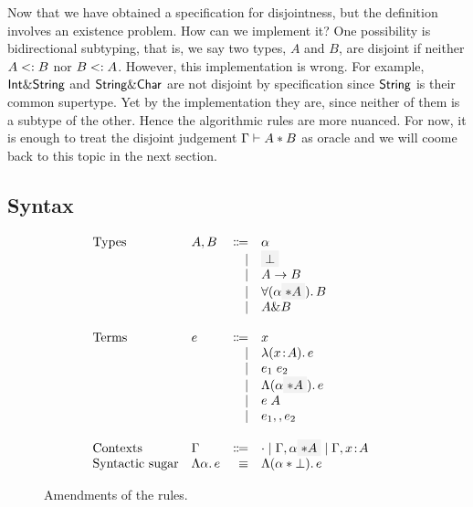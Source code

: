 Now that we have obtained a specification for disjointness, but the definition
involves an existence problem. How can we implement it? One possibility is
bidirectional subtyping, that is, we say two types, $A$ and $B$, are disjoint if
neither $A <: B$ nor $B <: A$. However, this implementation is
wrong. For example, $\textsf{Int} \& \textsf{String}$ and $\textsf{String} \& \textsf{Char}$ are
not disjoint by specification since $\textsf{String}$ is their common supertype. Yet
by the implementation they are, since neither of them is a subtype of
the other. 
Hence the algorithmic rules are more nuanced. For now, it is enough to treat the
disjoint judgement $\Gamma \vdash A * B$ as oracle and we will coome back to
this topic in the next section.

\subsection{Syntax}

\begin{figure}[h]
  \[
    \begin{array}{l}
      \begin{array}{llrll}
        \text{Types}
        & A, B & \Coloneqq & \alpha                  & \\
        &      & \mid & \highlight {$\bot$}          & \\
        &      & \mid & A \to B                      & \\
        &      & \mid & \for {(\alpha \highlight {$\disjoint A$})} B  & \\
        &      & \mid & A \inter B                   & \\

        \\
        \text{Terms}
        & e & \Coloneqq & x                        & \\
        &   & \mid & \lam {(x \oftype A)} e          & \\
        &   & \mid & \app {e_1} {e_2}              & \\
        &   & \mid & \blam {(\alpha \highlight {$\disjoint A$})} e  & \\
        &   & \mid & \tapp e A                     & \\
        &   & \mid & e_1 \mergeop e_2              & \\

        \\
        \text{Contexts}
        & \Gamma & \Coloneqq & \cdot
                   \mid \Gamma, \alpha \highlight {$\disjoint A$}
                   \mid \Gamma, x \oftype A  & \\

        \text{Syntactic sugar} & \blam \alpha e & \equiv & \blamdis \alpha \bot e & \\
      \end{array}
    \end{array}
  \]

  \caption{Amendments of the rules.}
  \label{fig:fi-syntax-dis}
\end{figure}

